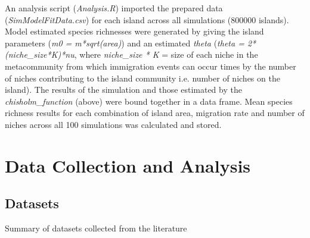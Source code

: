 \noindent An analysis script (\textit{Analysis.R}) imported the prepared data (\textit{SimModelFitData.csv}) for each island across all simulations (800000 islands). Model estimated species richnesses were generated by giving the island parameters (\textit{m0 = m*sqrt(area)}) and an estimated \textit{theta} (\textit{theta = 2*(niche\_size*K)*nu}, where \textit{niche\_size * K} = size of each niche in the metacommunity from which immigration events can occur times by the number of niches contributing to the island community i.e. number of niches on the island). The results of the simulation and those estimated by the \textit{chisholm\_function} (above) were bound together in a data frame. Mean species richness results for each combination of island area, migration rate and number of niches across all 100 simulations was calculated and stored.


\section{Data Collection and Analysis}

\subsection{Datasets}

\begin{table}[h!]
  \begin{center}
    \caption{Summary of datasets collected from the literature}
    \label{table1}
  \end{center}
\end{table}


